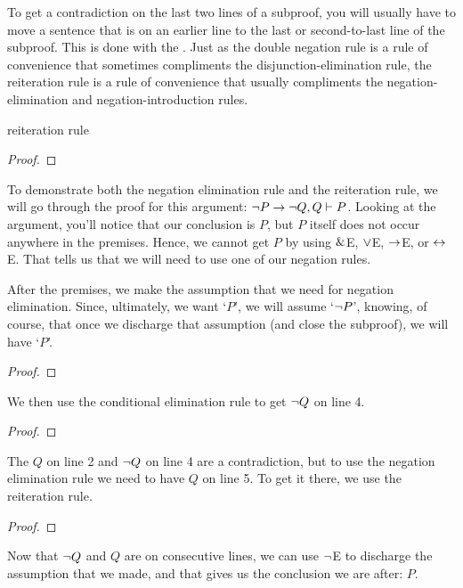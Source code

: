To get a contradiction on the last two lines of a subproof, you will usually have to move a sentence that is on an earlier line to the last or second-to-last line of the subproof. This is done with the . Just as the double negation rule is a rule of convenience that sometimes compliments the disjunction-elimination rule, the reiteration rule is a rule of convenience that usually compliments the negation-elimination and negation-introduction rules.  

\begin{factboxy}{reiteration rule}
\begin{proof}
	 
\end{proof}
\end{factboxy}

To demonstrate both the negation elimination rule and the reiteration rule, we will go through the proof for this argument: ${\neg} P \rightarrow {\neg} Q, Q \vdash P$. Looking at the argument, you'll notice that our conclusion is $P$, but $P$ itself does not occur anywhere in the premises. Hence, we cannot get $P$ by using $\mathbin{\&}$E, $\vee$E, $\rightarrow$E, or $\leftrightarrow$E. That tells us that we will need to use one of our negation rules.

After the premises, we make the assumption that we need for negation elimination. Since, ultimately, we want `$P$', we will assume `${\neg} P$', knowing, of course, that once we discharge that assumption (and close the subproof), we will have `$P$'.

\begin{proof}
	 \pr{}	
	 \pr{}
	\open
		\as{}
\end{proof}
We then use the conditional elimination rule to get ${\neg} Q$ on line 4. 
\begin{proof}
	 \pr{}	
	 \pr{}
	\open
		\as{}
\end{proof}
The $Q$ on line 2 and ${\neg} Q$ on line 4 are a contradiction, but to use the negation elimination rule we need to have $Q$ on line 5. To get it there, we use the reiteration rule. 

\begin{proof}
	 \pr{}	
	 \pr{}
	\open
		\as{}
\end{proof}
Now that ${\neg} Q$ and $Q$ are on consecutive lines, we can use ${\neg}$E to discharge the assumption that we made, and that gives us the conclusion we are after: $P$.

